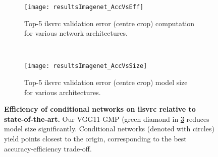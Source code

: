 \documentclass[thesis]{subfiles}
\begin{document}
	\begin{figure}[tbp] 
		\centering
		\begin{subfigure}[b]{0.9\linewidth}
			\centering
			\texttt{[image: resultsImagenet\_AccVsEff]}
			\caption{Top-5 \gls{ilsvrc} validation error (centre crop) \vs{}computation for various network architectures.}\label{fig:resultsImagenet_AccVsEff}
		\end{subfigure}
		~
		\begin{subfigure}[b]{0.9\linewidth}
			\centering
			\texttt{[image: resultsImagenet\_AccVsSize]}
			\caption{Top-5 \gls{ilsvrc} validation error (centre crop) \vs{}model size for various architectures.}\label{fig:resultsImagenet_AccVsSize}
		\end{subfigure}
		\caption[Efficiency of conditional networks on \gls{ilsvrc} relative to state-of-the-art]{\textbf{Efficiency of conditional networks on \gls{ilsvrc} relative to state-of-the-art.} Our VGG11-GMP (green diamond in \cref{fig:Imagenet_results} reduces model size significantly. Conditional networks (denoted with circles) yield points closest to the origin, corresponding to the best accuracy-efficiency trade-off.}\label{fig:Imagenet_results}
	\end{figure}
\end{document}

